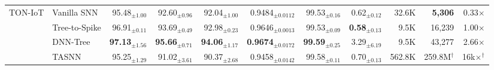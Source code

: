\begin{table}[!ht]
{\begin{tabular}{l l r r r r r r r r r}
\midrule
\multirow{4}{*}{TON-IoT}
& Vanilla SNN   & 95.48$_{\pm1.00}$ & 92.60$_{\pm0.96}$ & 92.04$_{\pm1.00}$ & 0.9484$_{\pm0.0112}$ & 99.53$_{\pm0.16}$ & 0.62$_{\pm0.12}$ & 32.6K & \cellcolor{bestcell}\textbf{5,306} & 0.33$\times$ \\
& Tree-to-Spike & 96.91$_{\pm0.11}$ & 93.69$_{\pm0.49}$ & 92.98$_{\pm0.23}$ & 0.9646$_{\pm0.0013}$ & 99.53$_{\pm0.09}$ & \cellcolor{bestcell}\textbf{0.58$_{\pm0.13}$} & 9.5K & 16,239 & 1.00$\times$ \\
& DNN-Tree      & \cellcolor{bestcell}\textbf{97.13$_{\pm1.56}$} & \cellcolor{bestcell}\textbf{95.66$_{\pm0.71}$} & \cellcolor{bestcell}\textbf{94.06$_{\pm1.17}$} & \cellcolor{bestcell}\textbf{0.9674$_{\pm0.0172}$} & \cellcolor{bestcell}\textbf{99.59$_{\pm0.25}$} & 3.29$_{\pm6.19}$ & 9.5K & 43,277 & 2.66$\times$ \\
& TASNN         & 95.25$_{\pm1.29}$ & 91.02$_{\pm3.61}$ & 90.37$_{\pm2.68}$ & 0.9458$_{\pm0.0142}$ & 99.58$_{\pm0.11}$ & 0.70$_{\pm0.13}$ & 562.8K & 259.8M$^\dagger$ & 16k$\times$$^\dagger$ \\
\bottomrule
\end{tabular}}
\end{table}

